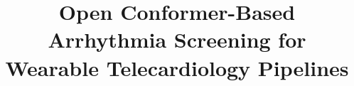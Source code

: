 \title[Open Conformer ECG Screening]{Open Conformer-Based Arrhythmia Screening for Wearable Telecardiology Pipelines}

\author*[1]{ }


\abstract{}
\keywords{}
